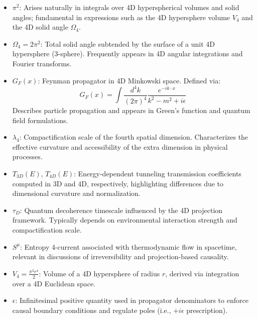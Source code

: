\documentclass[12pt,a4paper]{article}
\begin{document}
\begin{itemize}
    \item \(\pi^2\): Arises naturally in integrals over 4D hyperspherical volumes and solid angles; fundamental in expressions such as the 4D hypersphere volume \(V_4\) and the 4D solid angle \(\Omega_4\).
    
    \item \(\Omega_4 = 2\pi^2\): Total solid angle subtended by the surface of a unit 4D hypersphere (3-sphere). Frequently appears in 4D angular integrations and Fourier transforms.

    \item \(G_F(x)\): Feynman propagator in 4D Minkowski space. Defined via:
    \begin{equation}
    G_F(x) = \int \frac{d^4k}{(2\pi)^4} \frac{e^{-i k \cdot x}}{k^2 - m^2 + i\epsilon}
    \end{equation}
    Describes particle propagation and appears in Green's function and quantum field formulations.

    \item \(\lambda_4\): Compactification scale of the fourth spatial dimension. Characterizes the effective curvature and accessibility of the extra dimension in physical processes.

    \item \(T_{3D}(E)\), \(T_{4D}(E)\): Energy-dependent tunneling transmission coefficients computed in 3D and 4D, respectively, highlighting differences due to dimensional curvature and normalization.

    \item \(\tau_D\): Quantum decoherence timescale influenced by the 4D projection framework. Typically depends on environmental interaction strength and compactification scale.

    \item \(S^\mu\): Entropy 4-current associated with thermodynamic flow in spacetime, relevant in discussions of irreversibility and projection-based causality.

    \item \(V_4 = \frac{\pi^2 r^4}{2}\): Volume of a 4D hypersphere of radius \(r\), derived via integration over a 4D Euclidean space.

    \item \(\epsilon\): Infinitesimal positive quantity used in propagator denominators to enforce causal boundary conditions and regulate poles (i.e., \(+i\epsilon\) prescription).
\end{itemize}
\end{document}
